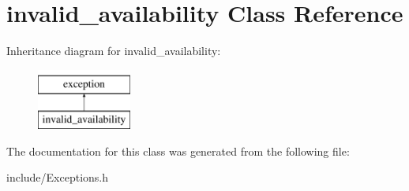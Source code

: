 \hypertarget{classinvalid__availability}{}\section{invalid\+\_\+availability Class Reference}
\label{classinvalid__availability}
Inheritance diagram for invalid\+\_\+availability\+:\begin{figure}[H]
\begin{center}
\leavevmode
\includegraphics[height=2.000000cm]{classinvalid__availability}
\end{center}
\end{figure}


The documentation for this class was generated from the following file\+:\begin{DoxyCompactItemize}
\item 
include/Exceptions.\+h\end{DoxyCompactItemize}
